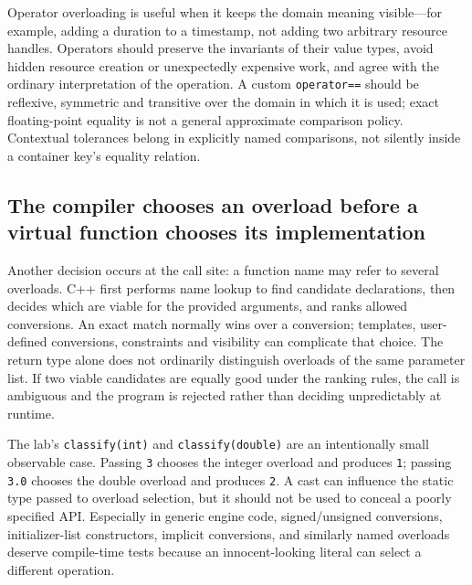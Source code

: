 Operator overloading is useful when it keeps the domain meaning visible---for example, adding a duration to a timestamp, not adding two arbitrary resource handles. Operators should preserve the invariants of their value types, avoid hidden resource creation or unexpectedly expensive work, and agree with the ordinary interpretation of the operation. A custom \texttt{operator==} should be reflexive, symmetric and transitive over the domain in which it is used; exact floating-point equality is not a general approximate comparison policy. Contextual tolerances belong in explicitly named comparisons, not silently inside a container key's equality relation.

\subsection{The compiler chooses an overload before a virtual function chooses its implementation}\label{05-engine-i-ch004-the-compiler-chooses-an-overload-before-a-virtual-function-chooses-its-implementation}

\hypertarget{05-engine-i-ch004-the-compiler-chooses-an-overload-before-a-virtual-function-chooses-its-implementation}{}

Another decision occurs at the call site: a function name may refer to several overloads. C++ first performs name lookup to find candidate declarations, then decides which are viable for the provided arguments, and ranks allowed conversions. An exact match normally wins over a conversion; templates, user-defined conversions, constraints and visibility can complicate that choice. The return type alone does not ordinarily distinguish overloads of the same parameter list. If two viable candidates are equally good under the ranking rules, the call is ambiguous and the program is rejected rather than deciding unpredictably at runtime.

The lab's \texttt{classify(int)} and \texttt{classify(double)} are an intentionally small observable case. Passing \texttt{3} chooses the integer overload and produces \texttt{1}; passing \texttt{3.0} chooses the double overload and produces \texttt{2}. A cast can influence the static type passed to overload selection, but it should not be used to conceal a poorly specified API. Especially in generic engine code, signed/unsigned conversions, initializer-list constructors, implicit conversions, and similarly named overloads deserve compile-time tests because an innocent-looking literal can select a different operation.

